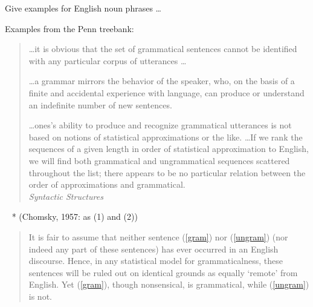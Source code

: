 \documentclass[a4paper,landscape,headrule,footrule,xetex]{foils}
\begin{document}
Give examples for English noun phrases \ldots

Examples from the Penn treebank:
\begin{exe}
  \ex {}
  \ex {}
  \ex {}
  \ex {}
  \ex {}
\ex {}
\ex {}
\end{exe}




\begin{quotation}
\ldots it is obvious that the set of grammatical
sentences cannot be identified with any particular corpus
of utterances \ldots  

\bigskip
\ldots a grammar mirrors the behavior of the speaker, who,
on the basis of a finite and accidental experience with
language, can produce or understand an indefinite
number of new sentences.   

\bigskip
\ldots  ones's ability to produce and recognize
grammatical utterances is not based on notions of
statistical approximations or the like.
\ldots  If we rank the sequences of a given length in order of
statistical approximation to English, we will find both
grammatical and ungrammatical sequences scattered
throughout the list; there appears to be no particular
relation between the order of approximations and
grammatical.  
\\ \mbox{} \hfill \citet[pp15--17]{Chomsky:1957} \textit{Syntactic Structures}  
\end{quotation}


 \begin{exe}
 \ex\label{gram} {~}
 \ex\label{ungram} *
 \hfill (Chomsky, 1957: as (1) and (2))
 \end{exe}
 \begin{quote}
   It is fair to assume that neither sentence (\ref{gram}) nor
   (\ref{ungram}) (nor indeed any part of these sentences) has ever
   occurred in an English discourse. Hence, in any statistical model
   for grammaticalness, these sentences will be ruled out on identical
   grounds as equally `remote' from English. Yet (\ref{gram}), though
   nonsensical, is grammatical, while (\ref{ungram}) is not.
 \end{quote}
\end{document}
